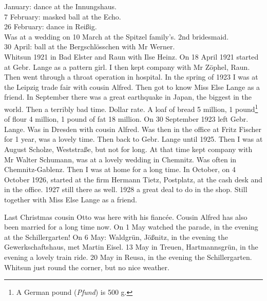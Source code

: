 \documentclass[a5paper,11pt,openany]{book}
\newcommand{\seite}[1]{\leavevmode\marginpar{\footnotesize\itshape\raggedright #1}\ignorespaces}
\newcommand{\jahr}[1]{\par\medskip\noindent{\scshape #1}\par\nopagebreak}
\begin{document}
\jahr{1921.}
\seite{4}
15 January: dance at the Innungshaus.\\
7 February: masked ball at the Echo.\\
26 February: dance in Reißig.\\
Was at a wedding on 10 March at the Spitzel family's.
2nd bridesmaid.\\
30 April: ball at the Bergschlösschen with Mr Werner.\\
Whitsun 1921 in Bad Elster and Raun with Ilse Heinz.
On 18 April 1921 started at Gebr. Lange as a pattern girl.
I then kept company with Mr Zöphel, Raun.
Then went through a throat operation in hospital.
In the spring of 1923
\seite{5}
I was at the Leipzig trade fair with cousin Alfred.
Then got to know Miss Else Lange as a friend.
In September there was a great earthquake in Japan, the biggest in the world.
Then a terribly bad time.
Dollar rate.
A loaf of bread 5 million, 1 pound\footnote{A German pound (\emph{Pfund}) is 500 g.} of flour 4 million, 1 pound of fat 18 million.
On 30 September 1923 left Gebr. Lange.
Was in Dresden with cousin Alfred.
Was then in the office at Fritz Fischer for 1 year, was a lovely time.
Then back to Gebr. Lange until 1925.
Then I was at
\seite{6}
August Scholze, Weststraße, but not for long.
At that time kept company with Mr Walter Schumann, was at a lovely wedding in Chemnitz.
Was often in Chemnitz-Gablenz.
Then I was at home for a long time.
In October, on 4 October 1926, started at the firm Hermann Tietz, Postplatz, at the cash desk and in the office.
1927 still there as well.
1928 a great deal to do in the shop.
Still together with Miss Else Lange as a friend.

\jahr{1928.}
\seite{7}
Last Christmas cousin Otto was here with his fiancée.
Cousin Alfred has also been married for a long time now.
On 1 May watched the parade, in the evening at the Schillergarten!
On 6 May: Waldgrün, Jößnitz, in the evening the Gewerkschaftshaus, met Martin Eisel.
13 May in Treuen, Hartmannsgrün, in the evening a lovely train ride.
20 May in Reusa, in the evening the Schillergarten.
Whitsun just round the corner, but no nice weather.
\end{document}
